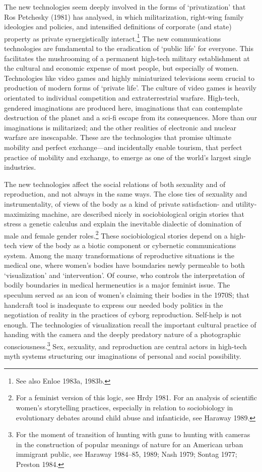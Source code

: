 \documentclass[DIV=12,%
               BCOR=10mm,%
               headinclude=false,%
               footinclude=false,open=any,%
               fontsize=11pt,%
               twoside,%
               paper=210mm:11in]%
               {scrbook}
\begin{document}
The new technologies seem deeply involved in the forms of ‘privatization’ that Ros Petchesky (1981) has analysed, in which militarization, right-wing family ideologies and policies, and intensified definitions of corporate (and state) property as private synergistically interact.\footnote{See also Enloe 1983a, 1983b.} The new communications technologies are fundamental to the eradication of ‘public life’ for everyone. This facilitates the mushrooming of a permanent high-tech military establishment at the cultural and economic expense of most people, but especially of women. Technologies like video games and highly miniaturized televisions seem crucial to production of modern forms of ‘private life’. The culture of video games is heavily orientated to individual competition and extraterrestrial warfare. High-tech, gendered imaginations are produced here, imaginations that can contemplate destruction of the planet and a sci-fi escape from its consequences. More than our imaginations is militarized; and the other realities of electronic and nuclear warfare are inescapable. These are the technologies that promise ultimate mobility and perfect exchange—and incidentally enable tourism, that perfect practice of mobility and exchange, to emerge as one of the world’s largest single industries.


The new technologies affect the social relations of both sexuality and of reproduction, and not always in the same ways. The close ties of sexuality and instrumentality, of views of the body as a kind of private satisfaction- and utility-maximizing machine, are described nicely in sociobiological origin stories that stress a genetic calculus and explain the inevitable dialectic of domination of male and female gender roles.\footnote{For a feminist version of this logic, see Hrdy 1981. For an analysis of scientific women’s storytelling practices, especially in relation to sociobiology in evolutionary debates around child abuse and infanticide, see Haraway 1989.} These sociobiological stories depend on a high-tech view of the body as a biotic component or cybernetic communications system. Among the many transformations of reproductive situations is the medical one, where women’s bodies have boundaries newly permeable to both ‘visualization’ and ‘intervention’. Of course, who controls the interpretation of bodily boundaries in medical hermeneutics is a major feminist issue. The speculum served as an icon of women’s claiming their bodies in the 1970S; that handcraft tool is inadequate to express our needed body politics in the negotiation of reality in the practices of cyborg reproduction. Self-help is not enough. The technologies of visualization recall the important cultural practice of handing with the camera and the deeply predatory nature of a photographic consciousness.\footnote{For the moment of transition of hunting with guns to hunting with cameras in the construction of popular meanings of nature for an American urban immigrant public, see Haraway 1984–85, 1989; Nash 1979; Sontag 1977; Preston 1984.} Sex, sexuality, and reproduction are central actors in high-tech myth systems structuring our imaginations of personal and social possibility.
\end{document}
